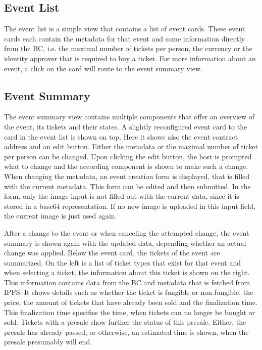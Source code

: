 \subsection{Event List}
The event list is a simple view that contains a list of event cards. These event cards each contain the metadata for that event and some information directly from the BC, i.e. the maximal number of tickets per person, the currency or the identity approver that is required to buy a ticket. For more information about an event, a click on the card will route to the event summary view.

\subsection{Event Summary}
The event summary view contains multiple components that offer an overview of the event, its tickets and their states. A slightly reconfigured event card to the card in the event list is shown on top. Here it shows also the event contract address and an edit button. Either the metadata or the maximal number of ticket per person can be changed. Upon clicking the edit button, the host is prompted what to change and the according component is shown to make such a change. When changing the metadata, an event creation form is displayed, that is filled with the current metadata. This form can be edited and then submitted. In the form, only the image input is not filled out with the current data, since it is stored in a base64 representation. If no new image is uploaded in this input field, the current image is just used again.

After a change to the event or when canceling the attempted change, the event summary is shown again with the updated data, depending whether an actual change was applied. Below the event card, the tickets of the event are summarized. On the left is a list of ticket types that exist for that event and when selecting a ticket, the information about this ticket is shown on the right. This information contains data from the BC and metadata that is fetched from IPFS. It shows details such as whether the ticket is fungible or non-fungible, the price, the amount of tickets that have already been sold and the finalization time. This finalization time specifies the time, when tickets can no longer be bought or sold.
Tickets with a presale show further the status of this presale. Either, the presale has already passed, or otherwise, an estimated time is shown, when the presale presumably will end.

